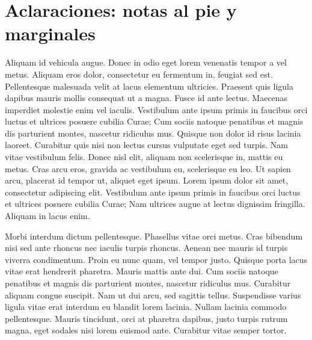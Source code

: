\documentclass[11pt, a4paper]{report}
\begin{document}
\section{Aclaraciones: notas al pie y marginales}


Aliquam id vehicula augue. Donec in odio eget lorem venenatis tempor a vel metus. Aliquam eros dolor, consectetur eu fermentum in, feugiat sed est. Pellentesque malesuada velit at lacus elementum ultricies. Praesent quis ligula dapibus mauris mollis consequat ut a magna. Fusce id ante lectus. Maecenas imperdiet molestie enim vel iaculis. Vestibulum ante ipsum primis in faucibus orci luctus et ultrices posuere cubilia Curae; Cum sociis natoque penatibus et magnis dis parturient montes, nascetur ridiculus mus. Quisque non dolor id risus lacinia laoreet. Curabitur quis nisi non lectus cursus vulputate eget sed turpis. Nam vitae vestibulum felis. Donec nisl elit, aliquam non scelerisque in, mattis eu metus. Cras arcu eros, gravida ac vestibulum eu, scelerisque eu leo. Ut sapien arcu, placerat id tempor ut, aliquet eget ipsum. Lorem ipsum dolor sit amet, consectetur adipiscing elit. Vestibulum ante ipsum primis in faucibus orci luctus et ultrices posuere cubilia Curae; Nam ultrices augue at lectus dignissim fringilla. Aliquam in lacus enim.

Morbi interdum dictum pellentesque. Phasellus vitae orci metus. Cras bibendum nisi sed ante rhoncus nec iaculis turpis rhoncus. Aenean nec mauris id turpis viverra condimentum. Proin eu nunc quam, vel tempor justo. Quisque porta lacus vitae erat hendrerit pharetra. Mauris mattis ante dui. Cum sociis natoque penatibus et magnis dis parturient montes, nascetur ridiculus mus. Curabitur aliquam congue suscipit. Nam ut dui arcu, sed sagittis tellus. Suspendisse varius ligula vitae erat interdum eu blandit lorem lacinia. Nullam lacinia commodo pellentesque. Mauris tincidunt, orci at pharetra dapibus, justo turpis rutrum magna, eget sodales nisi lorem euismod ante. Curabitur vitae semper tortor. 
\end{document}
